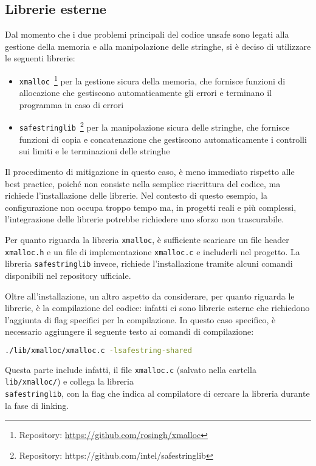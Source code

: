 \subsection*{Librerie esterne}
\label{sec:librerie-case-study}

Dal momento che i due problemi principali del codice unsafe sono legati alla gestione
della memoria e alla manipolazione delle stringhe, si è deciso di utilizzare le
seguenti librerie:
\begin{itemize}
  \item \texttt{xmalloc}~\footnote{Repository: \url{https://github.com/rosingh/xmalloc}}
    per la gestione sicura della memoria, che fornisce funzioni di allocazione che
    gestiscono automaticamente gli errori e terminano il programma in caso di errori

  \item \texttt{safestringlib}~\footnote{Repository: https://github.com/intel/safestringlib}
    per la manipolazione sicura delle stringhe, che fornisce funzioni di copia e
    concatenazione che gestiscono automaticamente i controlli sui limiti e le terminazioni
    delle stringhe
\end{itemize}

Il procedimento di mitigazione in questo caso, è meno immediato rispetto alle best
practice, poiché non consiste nella semplice riscrittura del codice, ma richiede
l'installazione delle librerie. Nel contesto di questo esempio, la configurazione
non occupa troppo tempo ma, in progetti reali e più complessi, l'integrazione delle
librerie potrebbe richiedere uno sforzo non trascurabile.

Per quanto riguarda la libreria \texttt{xmalloc}, è sufficiente scaricare un file
header \texttt{xmalloc.h} e un file di implementazione \texttt{xmalloc.c} e includerli
nel progetto. La libreria \texttt{safestringlib} invece, richiede l'installazione
tramite alcuni comandi disponibili nel repository ufficiale.

\medskip
Oltre all'installazione, un altro aspetto da considerare, per quanto riguarda le
librerie, è la compilazione del codice: infatti ci sono librerie esterne che
richiedono l'aggiunta di flag specifici per la compilazione. In questo caso specifico,
è necessario aggiungere il seguente testo ai comandi di compilazione: \begin{lstlisting}[language=bash, numbers=none]
./lib/xmalloc/xmalloc.c -lsafestring-shared
\end{lstlisting}
Questa parte include infatti, il file \texttt{xmalloc.c} (salvato nella cartella
\texttt{lib/xmalloc/}) e collega la libreria\\\texttt{safestringlib}, con la
flag che indica al compilatore di cercare la libreria durante la fase di linking.


